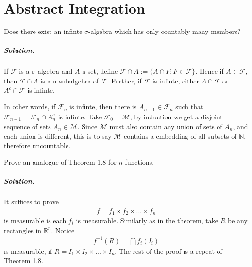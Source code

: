 \documentclass[../main.tex]{subfiles}
\begin{document}
\chapter{Abstract Integration}

\begin{exercise}
  Does there exist an infinte $ \sigma $-algebra which has only countably many members?
  \paragraph{Solution. }
  If $ \mathcal{F} $ is a $ \sigma $-algebra and $ A $ a set, define $ \mathcal{F} \cap A := \{A \cap F: F \in \mathcal{F}\}$. Hence if $ A \in \mathcal{F} $, then $ \mathcal{F} \cap A $ is a $ \sigma $-subalgebra of $ \mathcal{F} $. Further, if $ \mathcal{F} $ is infinte, either $ A \cap \mathcal{F} $ or $ A^c \cap \mathcal{F}$  is infinte.

  In other words, if $ \mathcal{F}_n $ is infinte, then there is $ A _{n+1} \in \mathcal{F}_n $ such that $ \mathcal{F} _{n+1} = \mathcal{F}_n \cap A_n^c $ is infinte. Take $ \mathcal{F}_0 = \mathcal{M} $, by induction we get a disjoint sequence of sets $ A_n \in \mathcal{M}$.
  Since $ \mathcal{M} $ must also contain any union of sets of $ A_n $, and each union is different, this is to say $ \mathcal{M} $ contains a embedding of all subsets of $ \mathbb{N} $, therefore uncountable.
\end{exercise}

\begin{exercise}
  Prove an analogue of Theorem 1.8 for $ n $ functions.
  \paragraph{Solution. }
  It suffices to prove
  \begin{align*}
    f = f_1 \times f_2 \times ... \times f_n
  \end{align*}
  is measurable is each $ f_i $ is measurable. Similarly as in the theorem, take $ R $ be any rectangles in $ \mathbb{R}^n $. Notice
  \begin{align*}
    f ^{-1}(R) = \bigcap f_i(I_i)
  \end{align*}
  is measurable, if $ R = I_1 \times I_2 \times ... \times I_n $. The rest of the proof is a repeat of Theorem 1.8.
\end{exercise}
\end{document}
